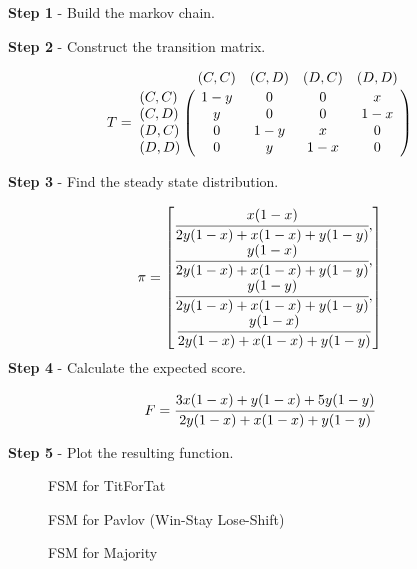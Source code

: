 \textbf{Step 1} - Build the markov chain.

\textbf{Step 2} - Construct the transition matrix.

\begin{equation}\label{eq:transition_matrix}
%
T = \bordermatrix{~      & (C, C) & (C, D) & (D, C) & (D, D) \cr
                  (C, C) & 1 - y  & 0      & 0      & x      \cr
                  (C, D) & y      & 0      & 0      & 1 - x  \cr
                  (D, C) & 0      & 1 - y  & x      & 0      \cr
                  (D, D) & 0      & y      & 1 - x  & 0}
%
\end{equation}

\textbf{Step 3} - Find the steady state distribution.

\begin{equation}\label{eq:steady_state}
%
\pi =
\begin{bmatrix}
\cfrac{x (1 - x)}{2y(1-x) + x(1-x) + y(1-y)}, \\
\cfrac{y (1 - x)}{2y(1-x) + x(1-x) + y(1-y)}, \\
\cfrac{y (1 - y)}{2y(1-x) + x(1-x) + y(1-y)}, \\
\cfrac{y (1 - x)}{2y(1-x) + x(1-x) + y(1-y)}
\end{bmatrix}
\end{equation}
\textbf{Step 4} - Calculate the expected score.

\begin{equation}
F = \cfrac{3x(1-x) + y(1-x) + 5y(1-y)}{2y(1-x) + x(1-x) + y(1-y)}
\end{equation}

\textbf{Step 5} - Plot the resulting function.


\begin{figure}[!hbtp]
    \begin{center}
        
        \caption{FSM for TitForTat}\label{fig:Tit4TatFSM}
        
        \caption{FSM for Pavlov (Win-Stay Lose-Shift)}\label{fig:PavlovFSM}
    \end{center}
\end{figure}

\begin{figure}[!hbtp]
    \begin{center}
        
        \caption{FSM for Majority}\label{fig:MajorityFSM}
    \end{center}
\end{figure}


